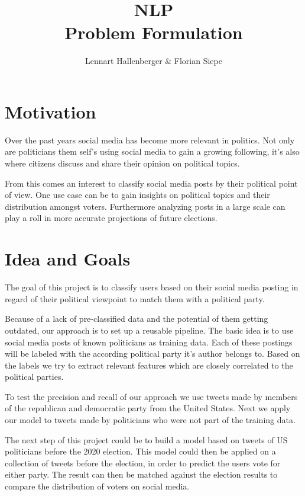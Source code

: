 \documentclass[12pt,a4paper]{article}
\title{\vspace{-2cm}NLP\\Problem Formulation}
\author{Lennart Hallenberger \& Florian Siepe}
\begin{document}
	
	\maketitle
	\section{Motivation}
	Over the past years social media has become more relevant in politics. 
	Not only are politicians them self's using social media to gain a growing following, 
	it's also where citizens discuss and share their opinion on political topics.
	
	From this comes an interest to classify social media posts by their political point of view. 
	One use case can be to gain insights on political topics and their distribution amongst voters.
	Furthermore analyzing posts in a large scale can play a roll in more accurate projections of future elections.
	
	\section{Idea and Goals}
	The goal of this project is to classify users based on their social media posting in regard of their political viewpoint to match them with a political party. 
	
	Because of a lack of pre-classified data and the potential of them getting outdated, our approach is to set up a reusable pipeline.
	The basic idea is to use social media posts of known politicians as training data.
	Each of these postings will be labeled with the according political party it's author belongs to. 
	Based on the labels we try to extract relevant features which are closely correlated to the political parties.
	
	To test the precision and recall of our approach we use tweets made by members of the republican and democratic party from the United States.
	Next we apply our model to tweets made by politicians who were not part of the training data.
	
	The next step of this project could be to build a model based on tweets of US politicians before the 2020 election.
	This model could then be applied on a collection of tweets before the election, in order to predict the users vote for either party.
	The result can then be matched against the election results to compare the distribution of voters on social media.
	
\end{document}
